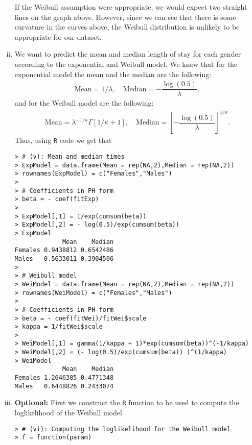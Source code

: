 \begin{enumerate}[(i)]
If the Weibull assumption were appropriate, we would expect two straight lines on the graph above. However, since we can see that there is some curvature in the curves above, the Weibull distribution is unlikely to be appropriate for our dataset.   
\item We want to predict the mean and median length of stay for each gender according to the 
exponential and Weibull model. We know that for the exponential model the mean and the median are the following:
\begin{align}
\text{Mean} = 1/\lambda, \quad \text{Median} = -\dfrac{\log(0.5)}{\lambda},
\nonumber
\end{align} 
and for the Weibull model are the following:
\begin{align}
\text{Mean} = \lambda^{-1/\kappa}\Gamma[1/\kappa+1], \quad \text{Median} = \left[-\dfrac{\log(0.5)}{\lambda}\right]^{1/\kappa}.
\nonumber
\end{align} 
Thus, using \verb|R| code we get that
\begin{spacing}{1.2}
\begin{footnotesize}
\begin{verbatim}
> # (v): Mean and median times
> ExpModel = data.frame(Mean = rep(NA,2),Median = rep(NA,2)) 
> rownames(ExpModel) = c("Females","Males")
> 
> # Coefficients in PH form
> beta = - coef(fitExp)
> 
> ExpModel[,1] = 1/exp(cumsum(beta))
> ExpModel[,2] = - log(0.5)/exp(cumsum(beta))
> ExpModel
             Mean    Median
Females 0.9438812 0.6542486
Males   0.5633011 0.3904506
> 
> # Weibull model
> WeiModel = data.frame(Mean = rep(NA,2),Median = rep(NA,2)) 
> rownames(WeiModel) = c("Females","Males")
> 
> # Coefficients in PH form
> beta = - coef(fitWei)/fitWei$scale
> kappa = 1/fitWei$scale
> 
> WeiModel[,1] = gamma(1/kappa + 1)*exp(cumsum(beta))^(-1/kappa)
> WeiModel[,2] = (- log(0.5)/exp(cumsum(beta)) )^(1/kappa)
> WeiModel
             Mean    Median
Females 1.2646385 0.4771348
Males   0.6448826 0.2433074
\end{verbatim}
\end{footnotesize}
\end{spacing}
\newpage
\item \textbf{Optional:} First we construct the \verb|R| function to be used to compute the loglikelihood of the Weibull model
\begin{spacing}{1.2}
\begin{footnotesize}
\begin{verbatim}
> # (vi): Computing the loglikelihood for the Weibull model
> f = function(param)

\end{verbatim}
\end{footnotesize}
\end{spacing}
\end{enumerate}
